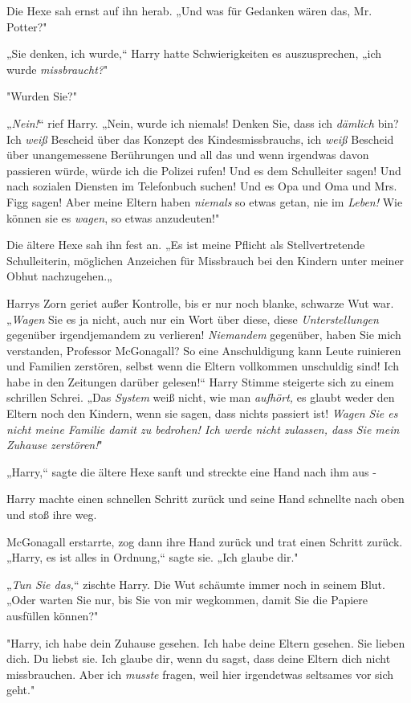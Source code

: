 {Die Hexe sah ernst auf ihn herab. „Und was für Gedanken wären das, Mr. Potter?"

„Sie denken, ich wurde,“ Harry hatte Schwierigkeiten es auszusprechen, „ich wurde \emph{missbraucht?}"

"Wurden Sie?"

„\emph{Nein!}“ rief Harry. „Nein, wurde ich niemals! Denken Sie, dass ich \emph{dämlich} bin? Ich \emph{weiß} Bescheid über das Konzept des Kindesmissbrauchs, ich \emph{weiß} Bescheid über unangemessene Berührungen und all das und wenn irgendwas davon passieren würde, würde ich die Polizei rufen! Und es dem Schulleiter sagen! Und nach sozialen Diensten im Telefonbuch suchen! Und es Opa und Oma und Mrs. Figg sagen! Aber meine Eltern haben \emph{niemals} so etwas getan, nie im \emph{Leben!} Wie können sie es \emph{wagen}, so etwas anzudeuten!"

Die ältere Hexe sah ihn fest an. „Es ist meine Pflicht als Stellvertretende Schulleiterin, möglichen Anzeichen für Missbrauch bei den Kindern unter meiner Obhut nachzugehen.„

Harrys Zorn geriet außer Kontrolle, bis er nur noch blanke, schwarze Wut war. „\emph{Wagen} Sie es ja nicht, auch nur ein Wort über diese, diese \emph{Unterstellungen} gegenüber irgendjemandem zu verlieren! \emph{Niemandem} gegenüber, haben Sie mich verstanden, Professor McGonagall? So eine Anschuldigung kann Leute ruinieren und Familien zerstören, selbst wenn die Eltern vollkommen unschuldig sind! Ich habe in den Zeitungen darüber gelesen!“ Harry Stimme steigerte sich zu einem schrillen Schrei. „Das \emph{System} weiß nicht, wie man \emph{aufhört,} es glaubt weder den Eltern noch den Kindern, wenn sie sagen, dass nichts passiert ist! \emph{Wagen Sie es nicht meine Familie damit zu bedrohen! Ich werde nicht zulassen, dass Sie mein} \emph{Zuhause zerstören!}"

„Harry,“ sagte die ältere Hexe sanft und streckte eine Hand nach ihm aus -

Harry machte einen schnellen Schritt zurück und seine Hand schnellte nach oben und stoß ihre weg.

McGonagall erstarrte, zog dann ihre Hand zurück und trat einen Schritt zurück. „Harry, es ist alles in Ordnung,“ sagte sie. „Ich glaube dir."

„\emph{Tun Sie das,}“ zischte Harry. Die Wut schäumte immer noch in seinem Blut. „Oder warten Sie nur, bis Sie von mir wegkommen, damit Sie die Papiere ausfüllen können?"

"Harry, ich habe dein Zuhause gesehen. Ich habe deine Eltern gesehen. Sie lieben dich. Du liebst sie. Ich glaube dir, wenn du sagst, dass deine Eltern dich nicht missbrauchen. Aber ich \emph{musste} fragen, weil hier irgendetwas seltsames vor sich geht."

}
